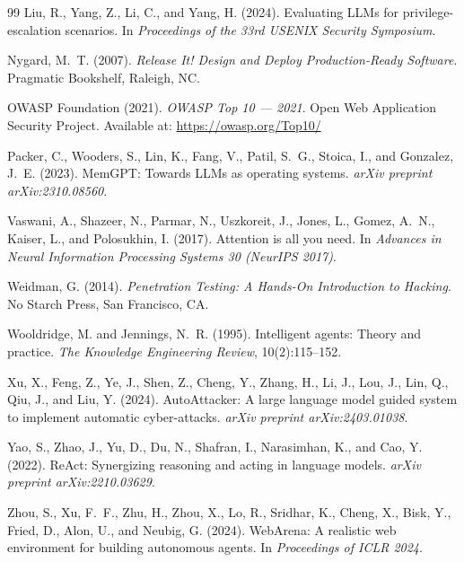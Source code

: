 \documentclass[12pt,a4paper,oneside,openany]{book}
\begin{document}
\begin{thebibliography}{99}
Liu, R., Yang, Z., Li, C., and Yang, H. (2024).
Evaluating LLMs for privilege-escalation scenarios.
In \textit{Proceedings of the 33rd USENIX Security Symposium}.

Nygard, M.~T. (2007).
\textit{Release It! Design and Deploy Production-Ready Software}.
Pragmatic Bookshelf, Raleigh, NC.

OWASP Foundation (2021).
\textit{OWASP Top 10 — 2021}.
Open Web Application Security Project.
Available at: \url{https://owasp.org/Top10/}

Packer, C., Wooders, S., Lin, K., Fang, V., Patil, S.~G., Stoica, I., and Gonzalez, J.~E. (2023).
MemGPT: Towards LLMs as operating systems.
\textit{arXiv preprint arXiv:2310.08560}.

Vaswani, A., Shazeer, N., Parmar, N., Uszkoreit, J., Jones, L., Gomez, A.~N., Kaiser, L., and Polosukhin, I. (2017).
Attention is all you need.
In \textit{Advances in Neural Information Processing Systems 30 (NeurIPS 2017)}.

Weidman, G. (2014).
\textit{Penetration Testing: A Hands-On Introduction to Hacking}.
No Starch Press, San Francisco, CA.

Wooldridge, M. and Jennings, N.~R. (1995).
Intelligent agents: Theory and practice.
\textit{The Knowledge Engineering Review}, 10(2):115--152.

Xu, X., Feng, Z., Ye, J., Shen, Z., Cheng, Y., Zhang, H., Li, J., Lou, J., Lin, Q., Qiu, J., and Liu, Y. (2024).
AutoAttacker: A large language model guided system to implement automatic cyber-attacks.
\textit{arXiv preprint arXiv:2403.01038}.

Yao, S., Zhao, J., Yu, D., Du, N., Shafran, I., Narasimhan, K., and Cao, Y. (2022).
ReAct: Synergizing reasoning and acting in language models.
\textit{arXiv preprint arXiv:2210.03629}.

Zhou, S., Xu, F.~F., Zhu, H., Zhou, X., Lo, R., Sridhar, K., Cheng, X., Bisk, Y., Fried, D., Alon, U., and Neubig, G. (2024).
WebArena: A realistic web environment for building autonomous agents.
In \textit{Proceedings of ICLR 2024}.

\end{thebibliography}

\end{document}
